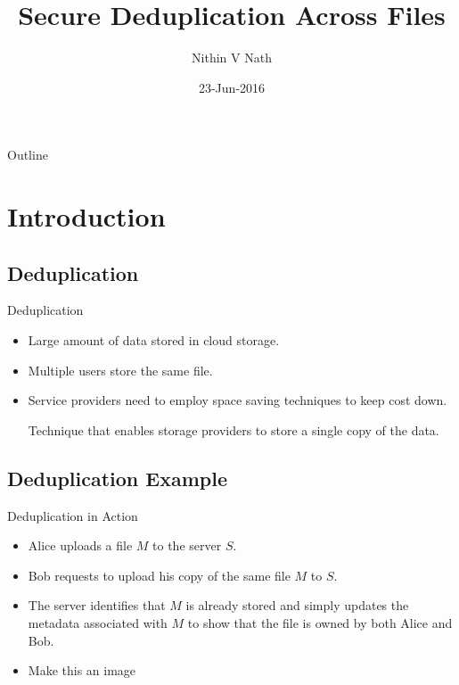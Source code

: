 \documentclass{beamer}
\title{Secure Deduplication Across Files}
\author{Nithin V Nath }
\institute[] %
{
	Advisor: Dr. Bhavana Kanukurthi\\\vspace*{2mm}
	Department of Computer Science and Automation\\
	Indian Institute of Science
}
\date{23-Jun-2016}
\begin{document}
\begin{frame}
  \titlepage
\end{frame}

\begin{frame}{Outline}
  \tableofcontents
\end{frame}

\section{Introduction}

\subsection{Deduplication}

\begin{frame}{Deduplication}{}
  \begin{itemize}
  \setlength\itemsep{1em}
  \item {
    Large amount of data stored in cloud storage.
  }
  \item {
    Multiple users store the same file.
  }
  \item {
    Service providers need to employ space saving techniques to keep cost down.
  }
	\begin{definition}
		Technique that enables storage providers to store a single copy of the data.
	\end{definition}
  \end{itemize}
\end{frame}

\subsection{Deduplication Example}

\begin{frame}{Deduplication in Action}
  \begin{itemize}
  \setlength\itemsep{1em}
  \item {
    Alice uploads a file $M$ to the server $S$.
    \pause %
  }
  \item {   
	 Bob requests to upload his copy of the same file $M$ to $S$.
  }
  \item<3-> {The server identifies
	that $M$ is already stored and simply updates the metadata associated with $M$ to show
	that the file is owned by both Alice and Bob.
  }
  \item Make this an image
  \end{itemize}
\end{frame}
\end{document}
